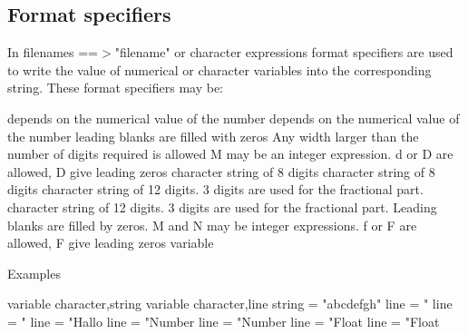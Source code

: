 \subsection*{Format specifiers}
\par
In filenames ==$> $"filename" or character expressions format specifiers 
are used to write the value of numerical or character variables into 
the corresponding string. These format specifiers may be: 
\par
\begin{MacVerbatim}
        depends on the numerical value of the number
        depends on the numerical value of the number
        leading blanks are filled with zeros
        Any width larger than the number of digits required is allowed
        M may be an integer expression.
        d or D are allowed, D give leading zeros
        character string of 8 digits
        character string of 8 digits
        character string of 12 digits. 3 digits are used for the
        fractional part.
        character string of 12 digits. 3 digits are used for the
        fractional part. Leading blanks are filled by zeros.
        M and N may be integer expressions.
        f or F are allowed, F give leading zeros
        variable
\end{MacVerbatim}
Examples 
\par
\begin{MacVerbatim}
variable character,string
variable character,line
string = "abcdefgh"
line   = "%
line   = "%
line   = "Hallo %
line   = "Number %
line   = "Number %
line   = "Float  %
line   = "Float  %
\end{MacVerbatim}
